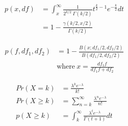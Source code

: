\begin{align*} 
    p(x,df) &= \int_x^{\infty}\frac{1}{2^{k/2}~\Gamma(k/2)}t^{\frac{k}{2}-1}e^{-\frac{k}{2}}dt\\
    &= 1-\frac{\gamma(k/2,x/2)}{\Gamma(k/2)}
\end{align*}

\begin{align*} 
    p(f,df_1,df_2) &= 1-\frac{B(x;df_1/2,df_2/2)}{B(df_1/2,df_2/2)} \\
    &\text{where}~x =\frac{df_1f}{df_1f+df_2}
\end{align*}


\begin{align*} 
    Pr(X=k) &= \frac{\lambda^ke^{-\lambda}}{k!} \\
    Pr(X\geq k) &= \sum_{n=k}^{\infty}\frac{\lambda^ne^{-\lambda}}{n!} \\
    p(X\geq k) &= \int_{k}^{\infty}\frac{\lambda^te^{-\lambda}}{\Gamma(t+1)}dt
\end{align*}

